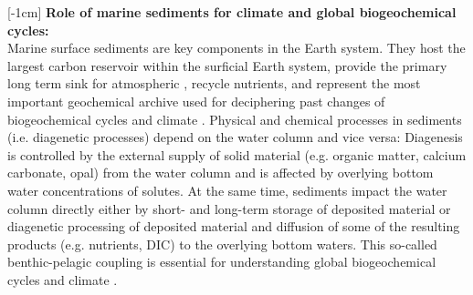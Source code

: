 \documentclass[gmd, manuscript]{copernicus}
\begin{document}

\tableofcontents

\newpage


\introduction  %
[-1cm]%
\textbf{Role of marine sediments for climate and global biogeochemical cycles:}\\
Marine surface sediments are key components in the Earth system. They host the largest carbon reservoir within the surficial Earth system, provide the primary long term sink for atmospheric , 
recycle nutrients, and represent the most important geochemical archive used for deciphering past changes of biogeochemical cycles and climate  \citep[e.g.][]{berner:91, archer_effect_1994, ridgwell_role_2005, arndt_quantifying_2013}. 
Physical and chemical processes in sediments (i.e. diagenetic processes) depend on the water column and vice versa: Diagenesis is controlled by the external supply of solid material 
(e.g. organic matter, calcium carbonate, opal) from the water column and is affected by overlying bottom water concentrations of solutes. 
At the same time, sediments impact the water column directly either by short- and long-term storage of deposited material or diagenetic processing of deposited material and 
diffusion of some of the resulting products (e.g. nutrients, DIC) to the overlying bottom waters. 
This so-called benthic-pelagic coupling is essential for understanding global biogeochemical cycles and climate \citep[e.g.][]{archer_effect_1994, archer_what_2000, soetaert_coupling_2000, mackenzie_sediments_2005}. 
\end{document}
